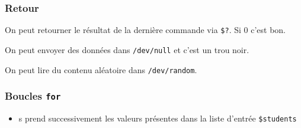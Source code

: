 \begin{Shaded}
\begin{Highlighting}[]
  \VariableTok{$\#}  
  
  
\end{Highlighting}
\end{Shaded}

\subsubsection{Retour}\label{retour}

On peut retourner le résultat de la dernière commande via \texttt{\$?}.
Si 0 c'est bon.

On peut envoyer des données dans \texttt{/dev/null} et c'est un trou
noir.

On peut lire du contenu aléatoire dans \texttt{/dev/random}.

\subsubsection{\texorpdfstring{Boucles
\texttt{for}}{Boucles for}}\label{boucles-for}

\begin{Shaded}
\begin{Highlighting}[]
\OperatorTok{=} 
 \KeywordTok{;}  
  \OperatorTok{=}\KeywordTok{\textasciigrave{}} \KeywordTok{|}  \StringTok{\textquotesingle{} \textquotesingle{}} \KeywordTok{\textasciigrave{}} 
   
\end{Highlighting}
\end{Shaded}

\begin{itemize}
\tightlist
\item
  s prend successivement les valeurs présentes dans la liste d'entrée
  \texttt{\$students}
\end{itemize}
